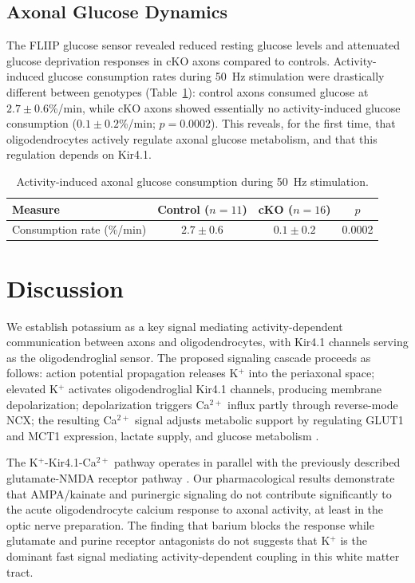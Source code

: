 \documentclass[12pt]{article}
\begin{document}
\subsection{Axonal Glucose Dynamics}

The FLIIP glucose sensor revealed reduced resting glucose levels and attenuated glucose deprivation responses in cKO axons compared to controls. Activity-induced glucose consumption rates during 50~Hz stimulation were drastically different between genotypes (Table~\ref{tab:glucose}): control axons consumed glucose at $2.7 \pm 0.6$\%/min, while cKO axons showed essentially no activity-induced glucose consumption ($0.1 \pm 0.2$\%/min; $p = 0.0002$). This reveals, for the first time, that oligodendrocytes actively regulate axonal glucose metabolism, and that this regulation depends on Kir4.1.

\begin{table}[ht]
\centering
\caption{Activity-induced axonal glucose consumption during 50~Hz stimulation.}
\label{tab:glucose}
\begin{tabular}{lccc}
\toprule
Measure & Control ($n = 11$) & cKO ($n = 16$) & $p$ \\
\midrule
Consumption rate (\%/min) & $2.7 \pm 0.6$ & $0.1 \pm 0.2$ & 0.0002 \\
\bottomrule
\end{tabular}
\end{table}

\section{Discussion}

We establish potassium as a key signal mediating activity-dependent communication between axons and oligodendrocytes, with Kir4.1 channels serving as the oligodendroglial sensor. The proposed signaling cascade proceeds as follows: action potential propagation releases K$^+$ into the periaxonal space; elevated K$^+$ activates oligodendroglial Kir4.1 channels, producing membrane depolarization; depolarization triggers Ca$^{2+}$ influx partly through reverse-mode NCX; the resulting Ca$^{2+}$ signal adjusts metabolic support by regulating GLUT1 and MCT1 expression, lactate supply, and glucose metabolism \citep{funfschilling2012glycolytic, lee2012oligodendroglia, battefeld2016myelinating}.

The K$^+$-Kir4.1-Ca$^{2+}$ pathway operates in parallel with the previously described glutamate-NMDA receptor pathway \citep{saab2016oligodendroglial}. Our pharmacological results demonstrate that AMPA/kainate and purinergic signaling do not contribute significantly to the acute oligodendrocyte calcium response to axonal activity, at least in the optic nerve preparation. The finding that barium blocks the response while glutamate and purine receptor antagonists do not suggests that K$^+$ is the dominant fast signal mediating activity-dependent coupling in this white matter tract.
\end{document}
